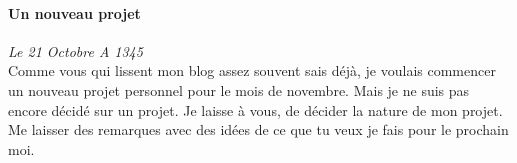 \documentclass{article}
\begin{document}
\paragraph{Un nouveau projet} \emph{Le 21 Octobre A 1345} \\
Comme vous qui lissent mon blog assez souvent sais déjà, je voulais commencer un nouveau projet personnel pour le mois de novembre. Mais je ne suis pas encore décidé sur un projet. Je laisse à vous, de décider la nature de mon projet. Me laisser des remarques avec des idées de ce que tu veux je fais pour le prochain moi.
\end{document}
